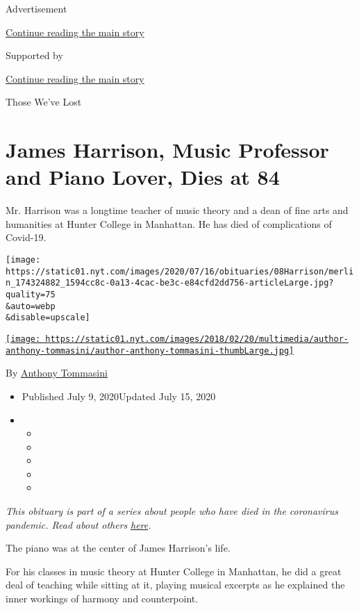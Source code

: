 Advertisement

\protect\hyperlink{after-top}{Continue reading the main story}

Supported by

\protect\hyperlink{after-sponsor}{Continue reading the main story}

Those We've Lost

\hypertarget{james-harrison-music-professor-and-piano-lover-dies-at-84}{%
\section{James Harrison, Music Professor and Piano Lover, Dies at
84}\label{james-harrison-music-professor-and-piano-lover-dies-at-84}}

Mr. Harrison was a longtime teacher of music theory and a dean of fine
arts and humanities at Hunter College in Manhattan. He has died of
complications of Covid-19.

\texttt{[image: https://static01.nyt.com/images/2020/07/16/obituaries/08Harrison/merlin\_174324882\_1594cc8c-0a13-4cac-be3c-e84cfd2dd756-articleLarge.jpg?quality=75\\\&auto=webp\\\&disable=upscale]}

\href{https://www.nytimes.com/by/anthony-tommasini}{\texttt{[image: https://static01.nyt.com/images/2018/02/20/multimedia/author-anthony-tommasini/author-anthony-tommasini-thumbLarge.jpg]}}

By \href{https://www.nytimes.com/by/anthony-tommasini}{Anthony
Tommasini}

\begin{itemize}
\item
  Published July 9, 2020Updated July 15, 2020
\item
  \begin{itemize}
  \item
  \item
  \item
  \item
  \item
  \end{itemize}
\end{itemize}

\emph{This obituary is part of a series about people who have died in
the coronavirus pandemic. Read about others}
\href{https://www.nytimes.com/interactive/2020/obituaries/people-died-coronavirus-obituaries.html}{\emph{here}}\emph{.}

The piano was at the center of James Harrison's life.

For his classes in music theory at Hunter College in Manhattan, he did a
great deal of teaching while sitting at it, playing musical excerpts as
he explained the inner workings of harmony and counterpoint.

